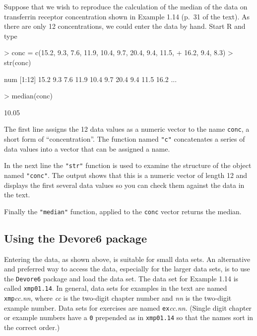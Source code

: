 \documentclass{book}
\begin{document}
Suppose that we wish to reproduce the calculation of the median of the
data on transferrin receptor concentration shown in Example 1.14
(p.~31 of the text).  As there are only 12 concentrations, we could
enter the data by hand.  Start R and type
\begin{Schunk}
\begin{Sinput}
> conc = c(15.2, 9.3, 7.6, 11.9, 10.4, 9.7, 20.4, 9.4, 11.5, 
+     16.2, 9.4, 8.3)
> str(conc)
\end{Sinput}
\begin{Soutput}
 num [1:12] 15.2 9.3 7.6 11.9 10.4 9.7 20.4 9.4 11.5 16.2 ...
\end{Soutput}
\begin{Sinput}
> median(conc)
\end{Sinput}
\begin{Soutput}
[1] 10.05
\end{Soutput}
\end{Schunk}

The first line assigns the 12 data values as a numeric vector to the
name \texttt{conc}, a short form of ``concentration''.  The function
named \texttt{"c"} concatenates a series of data values into a vector
that can be assigned a name.

In the next line the \texttt{"str"} function is used to examine the
structure of the object named \texttt{"conc"}.  The output shows that
this is a numeric vector of length 12 and displays the first several
data values so you can check them against the data in the text.

Finally the \texttt{"median"} function, applied to the \texttt{conc}
vector returns the median.

\subsection*{Using the Devore6 package}
\label{sec:UsingDevore6}

Entering the data, as shown above, is suitable for small data sets.
An alternative and preferred way to access the data, especially for
the larger data sets, is to use the \texttt{Devore6} package and load
the data set.  The data set for Example 1.14 is called
\texttt{xmp01.14}.  In general, data sets for examples in the text are
named \texttt{xmp}\textit{cc.nn}, where \textit{cc} is the two-digit
chapter number and \textit{nn} is the two-digit example number.
Data sets for exercises are named \texttt{ex}\textit{cc.nn}.  (Single
digit chapter or example numbers have a \texttt{0} prepended as in
\texttt{xmp01.14} so that the names sort in the correct order.)
\end{document}
